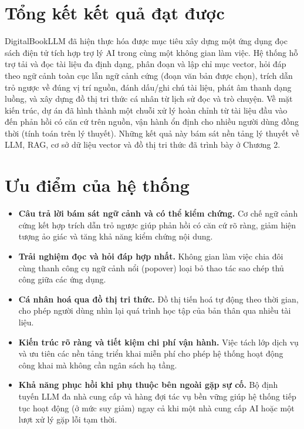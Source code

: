 \section{Tổng kết kết quả đạt được}
DigitalBookLLM đã hiện thực hóa được mục tiêu xây dựng một ứng dụng đọc sách điện tử tích hợp trợ lý AI trong cùng một không gian làm việc. Hệ thống hỗ trợ tải và đọc tài liệu đa định dạng, phân đoạn và lập chỉ mục vector, hỏi đáp theo ngữ cảnh toàn cục lẫn ngữ cảnh cứng (đoạn văn bản được chọn), trích dẫn trỏ ngược về đúng vị trí nguồn, đánh dấu/ghi chú tài liệu, phát âm thanh dạng luồng, và xây dựng đồ thị tri thức cá nhân từ lịch sử đọc và trò chuyện. Về mặt kiến trúc, dự án đã hình thành một chuỗi xử lý hoàn chỉnh từ tài liệu đầu vào đến phản hồi có căn cứ trên nguồn, vận hành ổn định cho nhiều người dùng đồng thời (tính toán trên lý thuyết). Những kết quả này bám sát nền tảng lý thuyết về LLM, RAG, cơ sở dữ liệu vector và đồ thị tri thức đã trình bày ở Chương 2. \cite{lewis2020retrieval,gao2023retrieval,malkov2018efficient}

\section{Ưu điểm của hệ thống}
\begin{itemize}
    \item \textbf{Câu trả lời bám sát ngữ cảnh và có thể kiểm chứng.} Cơ chế ngữ cảnh cứng kết hợp trích dẫn trỏ ngược giúp phản hồi có căn cứ rõ ràng, giảm hiện tượng ảo giác và tăng khả năng kiểm chứng nội dung.
    \item \textbf{Trải nghiệm đọc và hỏi đáp hợp nhất.} Không gian làm việc chia đôi cùng thanh công cụ ngữ cảnh nổi (popover) loại bỏ thao tác sao chép thủ công giữa các ứng dụng.
    \item \textbf{Cá nhân hoá qua đồ thị tri thức.} Đồ thị tiến hoá tự động theo thời gian, cho phép người dùng nhìn lại quá trình học tập của bản thân qua nhiều tài liệu.
    \item \textbf{Kiến trúc rõ ràng và tiết kiệm chi phí vận hành.} Việc tách lớp dịch vụ và ưu tiên các nền tảng triển khai miễn phí cho phép hệ thống hoạt động công khai mà không cần ngân sách hạ tầng.
    \item \textbf{Khả năng phục hồi khi phụ thuộc bên ngoài gặp sự cố.} Bộ định tuyến LLM đa nhà cung cấp và hàng đợi tác vụ bền vững giúp hệ thống tiếp tục hoạt động (ở mức suy giảm) ngay cả khi một nhà cung cấp AI hoặc một lượt xử lý gặp lỗi tạm thời.
\end{itemize}

